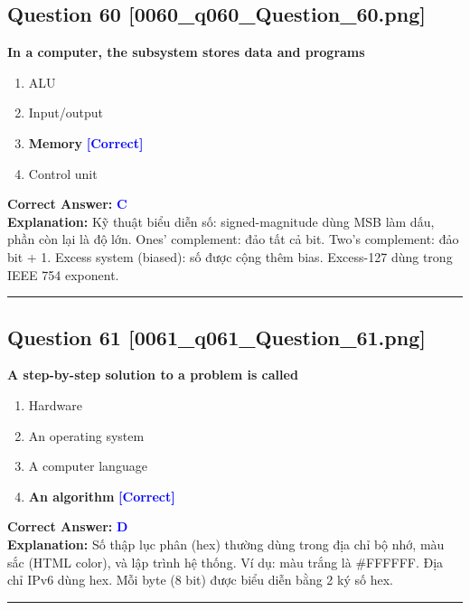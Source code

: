 \documentclass[11pt,a4paper]{article}
\begin{document}
\begin{minipage}{\textwidth}
\subsection*{Question 60 \quad \footnotesize{[0060\_q060\_Question\_60.png]}}
\noindent \textbf{In a computer, the subsystem stores data and programs}

\begin{enumerate}[label=\Alph*.]
    \item ALU
    \item Input/output
    \item \textbf{Memory} \hfill \textcolor{blue}{\textbf{[Correct]}}
    \item Control unit
\end{enumerate}

\noindent \textbf{Correct Answer:} \textcolor{blue}{\textbf{C}} \\[2pt]
\noindent \textbf{Explanation:} Kỹ thuật biểu diễn số: signed-magnitude dùng MSB làm dấu, phần còn lại là độ lớn. Ones' complement: đảo tất cả bit. Two's complement: đảo bit + 1. Excess system (biased): số được cộng thêm bias. Excess-127 dùng trong IEEE 754 exponent.

\par\vspace{0.3cm}
\hrule
\vspace{0.3cm}
\end{minipage}

\begin{minipage}{\textwidth}
\subsection*{Question 61 \quad \footnotesize{[0061\_q061\_Question\_61.png]}}
\noindent \textbf{A step-by-step solution to a problem is called}

\begin{enumerate}[label=\Alph*.]
    \item Hardware
    \item An operating system
    \item A computer language
    \item \textbf{An algorithm} \hfill \textcolor{blue}{\textbf{[Correct]}}
\end{enumerate}

\noindent \textbf{Correct Answer:} \textcolor{blue}{\textbf{D}} \\[2pt]
\noindent \textbf{Explanation:} Số thập lục phân (hex) thường dùng trong địa chỉ bộ nhớ, màu sắc (HTML color), và lập trình hệ thống. Ví dụ: màu trắng là \#FFFFFF. Địa chỉ IPv6 dùng hex. Mỗi byte (8 bit) được biểu diễn bằng 2 ký số hex.

\par\vspace{0.3cm}
\hrule
\vspace{0.3cm}
\end{minipage}
\end{document}
